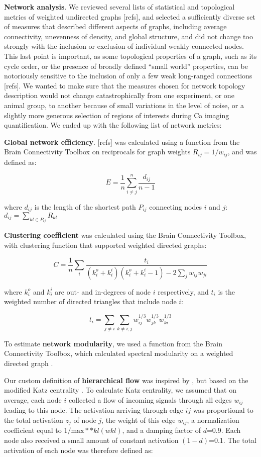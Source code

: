 \documentclass{article}
\begin{document}
\textbf{Network analysis}. We reviewed several lists of statistical and topological metrics of weighted undirected graphs [refs], and selected a sufficiently diverse set of measures that described different aspects of graphs, including average connectivity, unevenness of density, and global structure, and did not change too strongly with the inclusion or exclusion of individual weakly connected nodes. This last point is important, as some topological properties of a graph, such as its cycle order, or the presence of broadly defined “small world” properties, can be notoriously sensitive to the inclusion of only a few weak long-ranged connections [refs]. We wanted to make sure that the measures chosen for network topology description would not change catastrophically from one experiment, or one animal group, to another because of small variations in the level of noise, or a slightly more generous selection of regions of interests during Ca imaging quantification. We ended up with the following list of network metrics:

\textbf{Global network efficiency}. [refs] was calculated using a function from the Brain Connectivity Toolbox \citep{rubinov2010toolbox} on reciprocals for graph weights $R_{ij} = 1/w_{ij}$, and was defined as:

$$E = \frac{1}{n} \sum_{i \neq j}^n{\frac{d_{ij}}{n-1}}$$

where $d_{ij}$ is the length of the shortest path $P_{ij}$ connecting nodes $i$ and $j$: $d_{ij} = \sum_{kl \in P_{ij}}{R_{kl}}$

\textbf{Clustering coefficient} \citep{fagiolo2007} was calculated using the Brain Connectivity Toolbox, with clustering function that supported weighted directed graphs:

$$C = \frac{1}{n} \sum_i{\frac {t_i}{(k^o_i+k^i_i)(k^o_i+k^i_i-1)-2\sum_j{w_{ij}w_{ji}}}}$$

where $k^o_i$ and $k^i_i$ are out- and in-degrees of node $i$ respectively, and $t_i$ is the weighted number of directed triangles that include node $i$:

$$t_i = \sum_{j \neq i}{\sum_{k \neq i,j}{w^{1/3}_{ij}w^{1/3}_{jk}w^{1/3}_{ki}}}$$

To estimate \textbf{network modularity}, we used a function from the Brain Connectivity Toolbox, which calculated spectral modularity on a weighted directed graph \citep{reichardt2006community,leicht2008community}.

Our custom definition of \textbf{hierarchical flow} was inspired by \citep{mones2012hierarchy,mones2012hierarchy}, but based on the modified Katz centrality \citep{katz1953original,fletcher2018katz}. To calculate Katz centrality, we assumed that on average, each node $i$ collected a flow of incoming signals through all edges $w_{ij}$ leading to this node. The activation arriving through edge $ij$ was proportional to the total activation $z_j$ of node $j$, the weight of this edge $w_{ij}$, a normalization coefficient equal to $1/\text{max}*{*kl}(w{kl})$, and a damping factor of $d$=0.9. Each node also received a small amount of constant activation $(1-d)$=0.1. The total activation of each node was therefore defined as:
\end{document}

